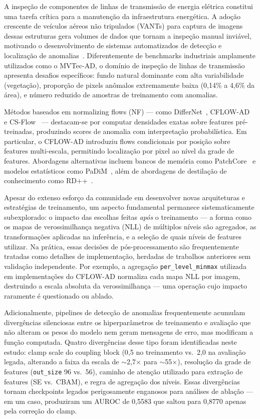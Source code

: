 \documentclass[conference]{IEEEtran}
\begin{document}
A inspeção de componentes de linhas de transmissão de energia elétrica constitui uma tarefa crítica para a manutenção da infraestrutura energética. A adoção crescente de veículos aéreos não tripulados (VANTs) para captura de imagens dessas estruturas gera volumes de dados que tornam a inspeção manual inviável, motivando o desenvolvimento de sistemas automatizados de detecção e localização de anomalias~\cite{vieira2023insplad}. Diferentemente de benchmarks industriais amplamente utilizados como o MVTec-AD, o domínio de inspeção de linhas de transmissão apresenta desafios específicos: fundo natural dominante com alta variabilidade (vegetação), proporção de pixels anômalos extremamente baixa (0{,}14\% a 4{,}6\% da área), e número reduzido de amostras de treinamento com anomalias.

Métodos baseados em normalizing flows (NF) --- como DifferNet~\cite{rudolph2021differnet}, CFLOW-AD~\cite{gudovskiy2022cflow} e CS-Flow~\cite{rudolph2022csflow} --- destacam-se por computar densidades exatas sobre features pré-treinadas, produzindo scores de anomalia com interpretação probabilística. Em particular, o CFLOW-AD introduziu flows condicionais por posição sobre features multi-escala, permitindo localização por pixel ao nível da grade de features. Abordagens alternativas incluem bancos de memória como PatchCore~\cite{roth2022patchcore} e modelos estatísticos como PaDiM~\cite{defard2021padim}, além de abordagens de destilação de conhecimento como RD++~\cite{deng2022rd}.

Apesar do extenso esforço da comunidade em desenvolver novas arquiteturas e estratégias de treinamento, um aspecto fundamental permanece sistematicamente subexplorado: o impacto das escolhas feitas \textit{após} o treinamento --- a forma como os mapas de verossimilhança negativa (NLL) de múltiplos níveis são agregados, as transformações aplicadas na inferência, e a seleção de quais níveis de features utilizar. Na prática, essas decisões de pós-processamento são frequentemente tratadas como detalhes de implementação, herdadas de trabalhos anteriores sem validação independente. Por exemplo, a agregação \texttt{per\_level\_minmax} utilizada em implementações do CFLOW-AD normaliza cada mapa NLL por imagem, destruindo a escala absoluta da verossimilhança --- uma operação cujo impacto raramente é questionado ou ablado.

Adicionalmente, pipelines de detecção de anomalias frequentemente acumulam divergências silenciosas entre os hiperparâmetros de treinamento e avaliação que não alteram os pesos do modelo nem geram mensagens de erro, mas modificam a função computada. Quatro divergências desse tipo foram identificadas neste estudo: clamp scale do coupling block (0{,}5 no treinamento vs.\ 2{,}0 na avaliação legada, alterando a faixa da escala de $\sim$2{,}7$\times$ para $\sim$55$\times$), resolução da grade de features (\texttt{out\_size} 96 vs.\ 56), caminho de atenção utilizado para extração de features (SE vs.\ CBAM), e regra de agregação dos níveis. Essas divergências tornam checkpoints legados perigosamente enganosos para análises de ablação --- em um caso, produziram um AUROC de 0{,}5583 que saltou para 0{,}8770 apenas pela correção do clamp.
\end{document}
